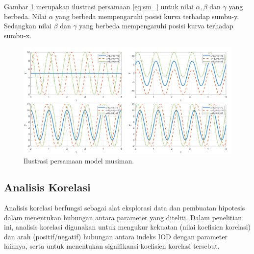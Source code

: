 \begin{spacing}{1.5}
	Gambar \ref{fig:sm} merupakan ilustrasi persamaan \ref{eq:sm_} untuk nilai $\alpha,\beta$ dan $\gamma$ yang berbeda. Nilai $\alpha$ yang berbeda mempengaruhi posisi kurva terhadap sumbu-y. Sedangkan nilai $\beta$ dan $\gamma$ yang berbeda mempengaruhi posisi kurva terhadap sumbu-x.
	\begin{figure}[H]
		\centering
		\includegraphics[width=15cm]{contents/Figures/sm_experiment}
		\caption{Ilustrasi persamaan model musiman.}
		\label{fig:sm}
	\end{figure}
	

	\subsection[Analisis Korelasi]{Analisis Korelasi}
		Analisis korelasi berfungsi sebagai alat eksplorasi data dan pembuatan hipotesis dalam menentukan hubungan antara parameter yang diteliti. Dalam penelitian ini, analisis korelasi digunakan untuk mengukur kekuatan (nilai koefisien korelasi) dan arah (positif/negatif) hubungan antara indeks IOD dengan parameter lainnya, serta untuk menentukan signifikansi koefisien korelasi tersebut.
		

\end{spacing}
